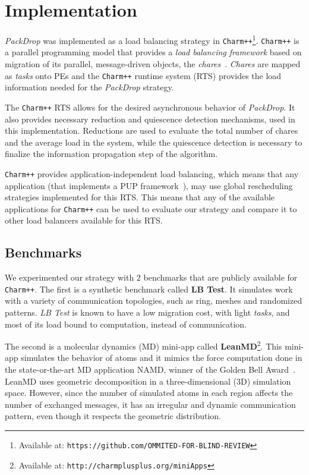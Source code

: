 \section{Implementation}

\textit{PackDrop} was implemented as a load balancing strategy in \texttt{Charm++}\footnote{Available at: \texttt{https://github.com/OMMITED-FOR-BLIND-REVIEW}}.
\texttt{Charm++} is a parallel programming model that provides a \textit{load balancing framework} based on migration of its parallel, message-driven objects, the \textit{chares}~\cite{CharmLOTR}.
\textit{Chares} are mapped as \textit{tasks} onto PEs and the \texttt{Charm++} runtime system (RTS) provides the load information needed for the \textit{PackDrop} strategy.

The \texttt{Charm++} RTS allows for the desired asynchronous behavior of \textit{PackDrop}.
It also provides necessary reduction and quiescence detection mechanisms, used in this implementation.
Reductions are used to evaluate the total number of chares and the average load in the system, while the quiescence detection is necessary to finalize the information propagation step of the algorithm.

\texttt{Charm++} provides application-independent load balancing, which means that any application (that implements a PUP framework~\cite{sc14charm}), may use global rescheduling strategies implemented for this RTS.
This means that any of the available applications for \texttt{Charm++} can be used to evaluate our strategy and compare it to other load balancers available for this RTS.


\subsection{Benchmarks}

We experimented our strategy with $2$ benchmarks that are publicly available for \texttt{Charm++}.
The first is a synthetic benchmark called \textbf{LB Test}. 
It simulates work with a variety of communication topologies, such as ring, meshes and randomized patterns.
\textit{LB Test} is known to have a low migration cost, with light \textit{tasks}, and most of its load bound to computation, instead of communication.

The second is a molecular dynamics (MD) mini-app called \textbf{LeanMD}\footnote{Available at: \tt{http://charmplusplus.org/miniApps}}.
This mini-app simulates the behavior of atoms and it mimics the force computation done in the state-or-the-art MD application NAMD, winner of the Golden Bell Award~\cite{grapevine}.
LeanMD uses geometric decomposition in a three-dimensional ($3$D) simulation space.
However, since the number of simulated atoms in each region affects the number of exchanged messages, it has an irregular and dynamic communication pattern, even though it respects the geometric distribution.


